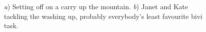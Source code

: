 \begin{figure}
\begin{subfigure}{0.49\textwidth}
 \caption{}\label{washing up}
\end{subfigure}
  \caption{\textit{a}) Setting off on a carry up the mountain.  \textit{b}) Janet and Kate tackling the washing up, probably everybody's least favourite bivi task. }
\end{figure}